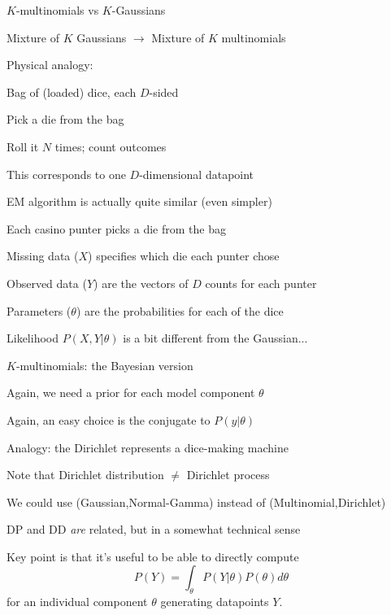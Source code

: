 \documentclass{beamer}
\begin{document}
\begin{frame}{$K$-multinomials vs $K$-Gaussians}

\itemb
\item Mixture of $K$ Gaussians $\to$ Mixture of $K$ multinomials
\item Physical analogy:
\itemb
 \item Bag of (loaded) dice, each $D$-sided
 \item Pick a die from the bag
 \item Roll it $N$ times; count outcomes
 \item This corresponds to one $D$-dimensional datapoint
\iteme
\item EM algorithm is actually quite similar (even simpler)
 \itemb
 \item Each casino punter picks a die from the bag
 \item Missing data ($X$) specifies which die each punter chose
 \item Observed data ($Y$) are the vectors of $D$ counts for each punter
 \item Parameters ($\theta$) are the probabilities for each of the dice
 \item Likelihood $P(X,Y|\theta)$ is a bit different from the Gaussian...
 \iteme
\iteme

\end{frame}


\begin{frame}{$K$-multinomials: the Bayesian version}

\itemb
\item Again, we need a prior for each model component $\theta$
\item Again, an easy choice is the conjugate to $P(y|\theta)$
\item Analogy: the Dirichlet represents a \alert{dice-making machine}
\item Note that Dirichlet distribution $\neq$ Dirichlet process
 \itemb
 \item We could use (Gaussian,Normal-Gamma) instead of (Multinomial,Dirichlet)
 \item DP and DD {\em are} related, but in a somewhat technical sense
 \iteme
\item Key point is that it's useful to be able to directly compute
\[
P(Y) = \int_{\theta} P(Y|\theta) P(\theta) d\theta
\]
for an individual component $\theta$ generating datapoints $Y$.
\iteme

\end{frame}
\end{document}
